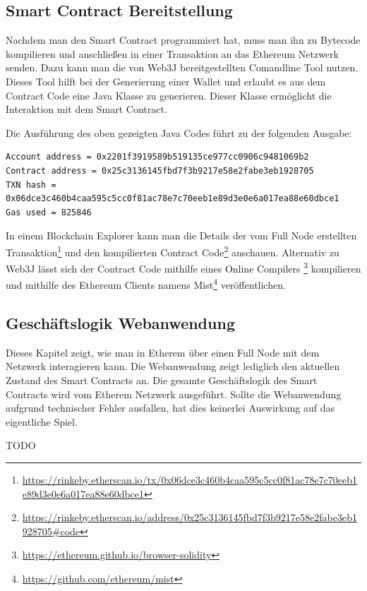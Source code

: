 \subsection{Smart Contract Bereitstellung}
Nachdem man den Smart Contract programmiert hat, muss man ihn zu Bytecode kompilieren und anschließen in einer Transaktion an das Ethereum Netzwerk senden. Dazu kann man die von Web3J bereitgestellten Comandline Tool nutzen. Dieses Tool hilft bei der Generierung einer Wallet und erlaubt es aus dem Contract Code eine Java Klasse zu generieren. Dieser Klasse ermöglicht die Interaktion mit dem Smart Contract. 


Die Ausführung des oben gezeigten Java Codes führt zu der folgenden Ausgabe:

\begin{lstlisting}[basicstyle=\small]
Account address = 0x2201f3919589b519135ce977cc0906c9481069b2
Contract address = 0x25c3136145fbd7f3b9217e58e2fabe3eb1928705
TXN hash = 0x06dce3c460b4caa595c5cc0f81ac78e7c70eeb1e89d3e0e6a017ea88e60dbce1
Gas used = 825846
\end{lstlisting}

In einem Blockchain Explorer kann man die Details der vom Full Node erstellten Transaktion\footnote{\url{https://rinkeby.etherscan.io/tx/0x06dce3c460b4caa595c5cc0f81ac78e7c70eeb1e89d3e0e6a017ea88e60dbce1}} und den kompilierten Contract Code\footnote{\url{https://rinkeby.etherscan.io/address/0x25c3136145fbd7f3b9217e58e2fabe3eb1928705\#code}} anschauen.
Alternativ zu Web3J lässt sich der Contract Code mithilfe eines Online Compilers \footnote{\url{https://ethereum.github.io/browser-solidity}} kompilieren und mithilfe des Ethereum Clients namens Mist\footnote{\url{https://github.com/ethereum/mist}} veröffentlichen.

\subsection{Geschäftslogik Webanwendung}

Dieses Kapitel zeigt, wie man in Etherem über einen Full Node mit dem Netzwerk interagieren kann. Die Webanwendung zeigt lediglich den aktuellen Zustand des Smart Contracts an. Die gesamte Geschäftslogik des Smart Contracts wird vom Etherem Netzwerk ausgeführt. Sollte die Webanwendung aufgrund technischer Fehler ausfallen, hat dies keinerlei Auswirkung auf das eigentliche Spiel.

TODO 

